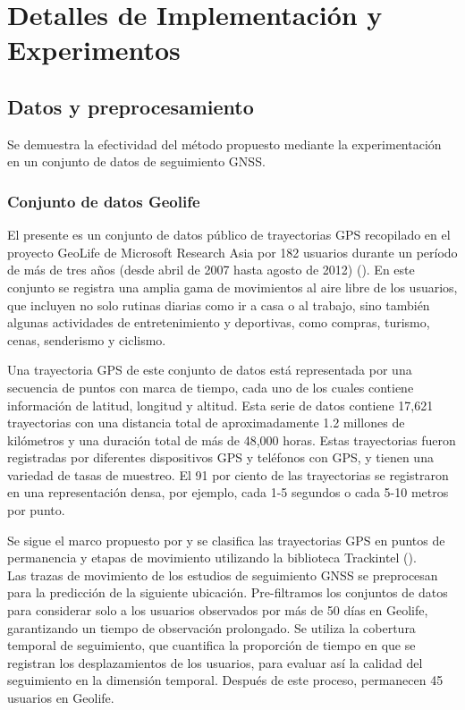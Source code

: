 \chapter{Detalles de Implementación y Experimentos}\label{chapter:implementation}
\section{Datos y preprocesamiento}

Se demuestra la efectividad del m\'etodo propuesto mediante la experimentaci\'on en 
un conjunto de datos de seguimiento GNSS.

\subsection{Conjunto de datos Geolife}
El presente es un conjunto de datos p\'ublico de trayectorias GPS recopilado en el 
proyecto GeoLife de Microsoft Research Asia por 182 usuarios durante 
un período de más de tres años (desde abril de 2007 hasta agosto de 2012) (\cite{zheng2011geolife}). 
En este conjunto se registra una amplia gama de movimientos al aire libre 
de los usuarios, que incluyen no solo rutinas diarias como ir a casa o 
al trabajo, sino también algunas actividades de entretenimiento y deportivas, 
como compras, turismo, cenas, senderismo y ciclismo. 

Una trayectoria GPS de este conjunto de datos está representada por una 
secuencia de puntos con marca de tiempo, cada uno de los cuales contiene 
información de latitud, longitud y altitud. Esta serie de datos 
contiene 17,621 trayectorias con una distancia total de aproximadamente 
1.2 millones de kilómetros y una duración total de más de 48,000 horas. 
Estas trayectorias fueron registradas por diferentes dispositivos GPS y 
teléfonos con GPS, y tienen una variedad de tasas de muestreo. 
El 91 por ciento de las trayectorias se registraron en una representación 
densa, por ejemplo, cada 1-5 segundos o cada 5-10 metros por punto.

Se sigue el marco propuesto 
por \cite{Zheng2010GeoLife} y se clasifica las trayectorias GPS en puntos 
de permanencia y etapas de movimiento utilizando la biblioteca 
Trackintel (\cite{martin2023trackintel}).\\

Las trazas de movimiento de los estudios de seguimiento GNSS se 
preprocesan para la predicci\'on de la siguiente ubicaci\'on. 
Pre-filtramos los conjuntos de datos para considerar solo a los 
usuarios observados por m\'as de 50 d\'ias 
en Geolife, garantizando un tiempo de observaci\'on prolongado. 
Se utiliza la cobertura temporal de seguimiento, que 
cuantifica la proporci\'on de tiempo en que se registran los 
desplazamientos de los usuarios, para evaluar as\'i la calidad del 
seguimiento en la dimensi\'on temporal. Despu\'es de este proceso, 
permanecen 45 usuarios en Geolife.

